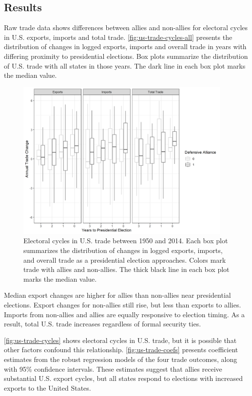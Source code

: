 \documentclass[12pt]{article}
\begin{document}
\subsection{Results}


Raw trade data shows differences between allies and non-allies for electoral cycles in U.S. exports, imports and total trade. 
\autoref{fig:us-trade-cycles-all} presents the distribution of changes in logged exports, imports and overall trade in years with differing proximity to presidential elections.
Box plots summarize the distribution of U.S. trade with all states in those years. 
The dark line in each box plot marks the median value. 


\begin{figure}
\centering
\includegraphics[width=0.95\textwidth]{../figures/us-trade-cycles-all.png}
\caption{Electoral cycles in U.S. trade between 1950 and 2014. Each box plot summarizes the distribution of changes in logged exports, imports, and overall trade as a presidential election approaches. Colors mark trade with allies and non-allies. The thick black line in each box plot marks the median value.}
\label{fig:us-trade-cycles-all}
\end{figure}


Median export changes are higher for allies than non-allies near presidential elections. 
Export changes for non-allies still rise, but less than exports to allies. 
Imports from non-allies and allies are equally responsive to election timing. 
As a result, total U.S. trade increases regardless of formal security ties.


\autoref{fig:us-trade-cycles} shows electoral cycles in U.S. trade, but it is possible that other factors confound this relationship.
\autoref{fig:us-trade-coefs} presents coefficient estimates from the robust regression models of the four trade outcomes, along with 95\% confidence intervals. 
These estimates suggest that allies receive substantial U.S. export cycles, but all states respond to elections with increased exports to the United States. 
\end{document}
